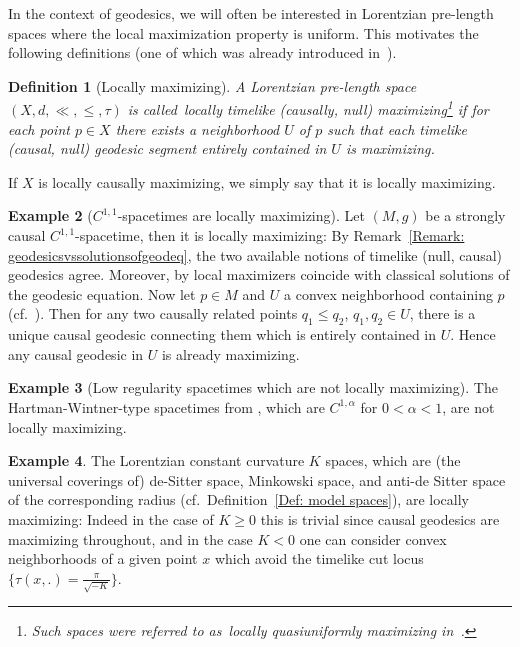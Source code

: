\documentclass[a4paper,11pt]{article}
\numberwithin{equation}{section}
\theoremstyle{plain}
\newtheorem{Definition}{Definition}[section]
\theoremstyle{definition}
\newtheorem{Example}[Definition]{Example}
\begin{document}
In the context of geodesics, we will often be interested in Lorentzian pre-length spaces where the local maximization property is uniform. This motivates the following definitions (one of which was already introduced in~\cite[Def.\ 2.20]{beran2023splitting}).

\begin{Definition}[Locally maximizing]\label{def:locally-maximising}
A Lorentzian pre-length space $(X,d,\ll,\leq,\tau)$ is called~\emph{locally timelike (causally, null) maximizing}\footnote{Such spaces were referred to as~\emph{locally quasiuniformly maximizing} in~\cite[Def.\ 2.20]{beran2023splitting}.} if for each point $p \in X$ there exists a neighborhood $U$ of $p$ such that each timelike (causal, null) geodesic segment entirely contained in $U$ is maximizing.
\end{Definition}


If $X$ is locally causally maximizing, we simply say that it is locally maximizing.

\begin{Example}[$C^{1,1}$-spacetimes are locally maximizing]
Let $(M,g)$ be a strongly causal $C^{1,1}$-spacetime, then it is locally maximizing: By Remark~\ref{Remark: geodesicsvssolutionsofgeodeq}, the two available notions of timelike (null, causal) geodesics agree. Moreover, by \cite[Thm.\ 6]{minguzzi2015convex} local maximizers coincide with classical solutions of the geodesic equation.
Now let $p \in M$ and $U$ a convex neighborhood containing $p$ (cf.\ \cite{kunzinger2014regularisation,minguzzi2015convex}). Then 
for any two causally related points $q_1 \leq q_2$, $q_1,q_2\in U$, there is a unique causal geodesic connecting them which is entirely contained in $U$. Hence any causal geodesic in $U$ is already maximizing.
\end{Example}

\begin{Example}[Low regularity spacetimes which are not locally maximizing] The Hartman-Wintner-type spacetimes from \cite[Ex.\ 2.4]{samann2018geodesics}, which are $C^{1,\alpha}$ for $0<\alpha<1$, are not locally maximizing.
\end{Example}

\begin{Example}
    The Lorentzian constant curvature $K$ spaces, which are (the universal coverings of) de-Sitter space, Minkowski space, and anti-de Sitter space of the corresponding radius (cf.\ Definition~\ref{Def: model spaces}), are locally maximizing: Indeed in the case of $K \geq 0$ this is trivial since causal geodesics are maximizing throughout, and in the case $K < 0$ one can consider convex neighborhoods of a given point $x$ which avoid the timelike cut locus 
    $\{\tau(x,.) = \frac{\pi}{\sqrt{-K}}\}$.
\end{Example}
\end{document}
